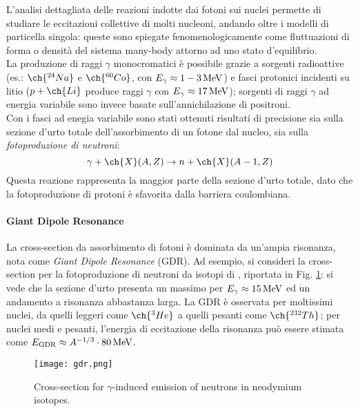 L'analisi dettagliata delle reazioni indotte dai fotoni sui nuclei permette di studiare le eccitazioni collettive di molti nucleoni, andando oltre i modelli di particella singola: queste sono spiegate fenomenologicamente come fluttuazioni di forma o densità del sistema many-body attorno ad uno stato d'equilibrio.\\
La produzione di raggi $ \gamma $ monocromatici è possibile grazie a sorgenti radioattive (es.: $ \ch{^{24}Na} $ e $ \ch{^{60}Co} $, con $ E_{\gamma} \approx 1-3\,\mathrm{MeV} $) e fasci protonici incidenti su litio ($ p + \ch{Li} $ produce raggi $ \gamma $ con $ E_{\gamma} \approx 17\,\mathrm{MeV} $); sorgenti di raggi $ \gamma $ ad energia variabile sono invece basate sull'annichilazione di positroni.\\
Con i fasci ad enegia variabile sono stati ottenuti risultati di precisione sia sulla sezione d'urto totale dell'assorbimento di un fotone dal nucleo, sia sulla \textit{fotoproduzione di neutroni}:
\begin{equation*}
	\gamma + \ch{X}(A,Z)\rightarrow n + \ch{X}(A-1,Z)
\end{equation*}
Questa reazione rappresenta la maggior parte della sezione d'urto totale, dato che la fotoproduzione di protoni è sfavorita dalla barriera coulombiana.

\paragraph{Giant Dipole Resonance}

La cross-section da assorbimento di fotoni è dominata da un'ampia risonanza, nota come \textit{Giant Dipole Resonance} (GDR). Ad esempio, si consideri la cross-section per la fotoproduzione di neutroni da isotopi di , riportata in Fig. \ref{gdr-nd}: si vede che la sezione d'urto presenta un massimo per $ E_{\gamma} \approx 15\,\mathrm{MeV} $ ed un andamento a risonanza abbastanza larga. La GDR è osservata per moltissimi nuclei, da quelli leggeri come $ \ch{^3He} $ a quelli pesanti come $ \ch{^{232}Th} $; per nuclei medi e pesanti, l'energia di eccitazione della risonanza può essere stimata come $ E_{\text{GDR}} \approx A^{-1/3} \cdot 80\,\mathrm{MeV} $.

\begin{figure}
	\centering
	\texttt{[image: gdr.png]}
	\caption{Cross-section for $ \gamma $-induced emission of neutrons in neodymium isotopes.}
	\label{gdr-nd}
\end{figure}

